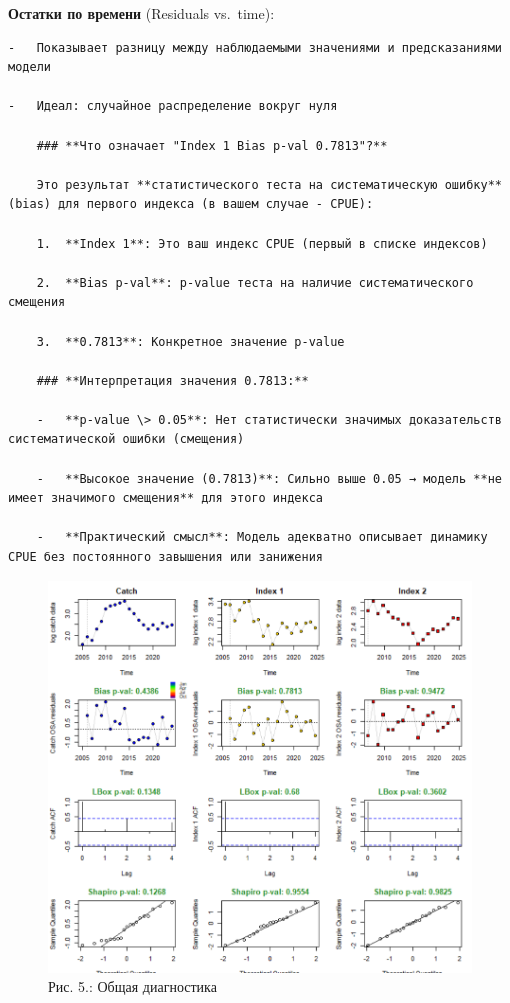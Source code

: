 \documentclass[
  letterpaper,
  DIV=11,
  numbers=noendperiod]{scrreprt}
\begin{document}
\textbf{Остатки по времени} (Residuals vs.~time):

\begin{verbatim}
-   Показывает разницу между наблюдаемыми значениями и предсказаниями модели

-   Идеал: случайное распределение вокруг нуля

    ### **Что означает "Index 1 Bias p-val 0.7813"?**

    Это результат **статистического теста на систематическую ошибку** (bias) для первого индекса (в вашем случае - CPUE):

    1.  **Index 1**: Это ваш индекс CPUE (первый в списке индексов)

    2.  **Bias p-val**: p-value теста на наличие систематического смещения

    3.  **0.7813**: Конкретное значение p-value

    ### **Интерпретация значения 0.7813:**

    -   **p-value \> 0.05**: Нет статистически значимых доказательств систематической ошибки (смещения)

    -   **Высокое значение (0.7813)**: Сильно выше 0.05 → модель **не имеет значимого смещения** для этого индекса

    -   **Практический смысл**: Модель адекватно описывает динамику CPUE без постоянного завышения или занижения
\end{verbatim}

\begin{figure}[H]

{\centering \includegraphics[width=0.8\linewidth,height=\textheight,keepaspectratio]{images/SPICT5.PNG}

}

\caption{Рис. 5.: Общая диагностика}

\end{figure}%
\end{document}
